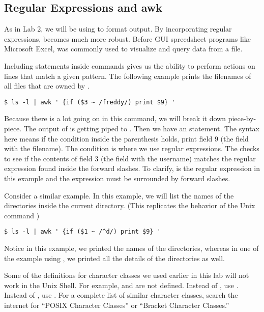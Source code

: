 \subsection*{Regular Expressions and awk}
As in Lab 2, we will be using  to format output. By incorporating regular expressions,  becomes much more robust. Before GUI spreedsheet programs like Microsoft Excel,  was commonly used to visualize and query data from a file.

Including  statements inside  commands gives us the ability to perform actions on lines that match a given pattern. The following example prints the filenames of all files that are owned by .
\begin{lstlisting}
$ ls -l | awk ' {if ($3 ~ /freddy/) print $9} '
\end{lstlisting}

Because there is a lot going on in this command, we will break it down piece-by-piece. The output of  is getting piped to . Then we have an  statement. The syntax here means if the condition inside the parenthesis holds, print field $9$ (the field with the filename). The condition is where we use regular expressions. The \li{\~} checks to see if the contents of field $3$ (the field with the username) matches the regular expression found inside the forward slashes. To clarify,  is the regular expression in this example and the expression must be surrounded by forward slashes.

Consider a similar example. In this example, we will list the names of the directories inside the current directory. (This replicates the behavior of the Unix command )

\begin{lstlisting}
$ ls -l | awk ' {if ($1 ~ /^d/) print $9} '
\end{lstlisting}

Notice in this example, we printed the names of the directories, whereas in one of the example using , we printed all the details of the directories as well.

\begin{warn}
Some of the definitions for character classes we used earlier in this lab will not work in the Unix Shell. For example, \li{\\w} and \li{\\d} are not defined. Instead of \li{\\w}, use \li{[[:alnum:]]}. Instead of \li{\\d}, use \li{[[:digit:]]}. For a complete list of similar character classes, search the internet for ``POSIX Character Classes'' or ``Bracket Character Classes.''
\end{warn}

